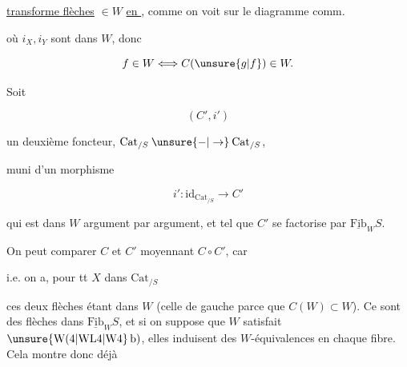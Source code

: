 
\uline{transforme flèches} $\in W$ \uline{en }, comme on voit sur le diagramme comm.


où $i_X,i_Y$ sont dans $W$, donc

\[
f\in W\Longleftrightarrow C(\unsure{g|f})\in W.
\]

Soit

\[
(C',i')
\]

un deuxième foncteur, $\mathrm{Cat}_{/S}\mathbin{\unsure{-|\to}}\mathrm{Cat}_{/S}$,

muni d'un morphisme

\[
i':\mathrm{id}_{\mathrm{Cat}_{/S}}\longrightarrow C'
\]

qui est dans $W$ argument par argument, et tel que $C'$ se factorise par $\underline{\mathrm{Fib}}_W S$.

On peut comparer $C$ et $C'$ moyennant $C\circ C'$, car


i.e. on a, pour tt $X$ dans $\mathrm{Cat}_{/S}$



ces deux flèches étant dans $W$ (celle de gauche parce que $C(W)\subset W$). Ce sont des flèches dans $\underline{\mathrm{Fib}}_W S$, et si on  suppose que $W$ satisfait $\unsure{\mathrm{W}(4|\mathrm{WL}4|\mathrm{W}4}\,\mathrm b)$, elles induisent des $W$-équivalences en chaque fibre. Cela montre donc déjà

